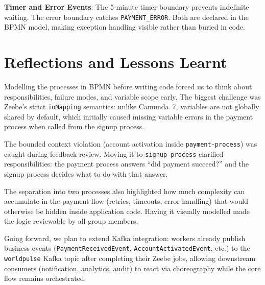 \documentclass[10pt,a4paper]{article}
\begin{document}
\textbf{Timer and Error Events}: The 5-minute timer boundary prevents indefinite waiting. The error boundary catches \texttt{PAYMENT\_ERROR}. Both are declared in the BPMN model, making exception handling visible rather than buried in code.


\section{Reflections and Lessons Learnt}

Modelling the processes in BPMN before writing code forced us to think about responsibilities, failure modes, and variable scope early. The biggest challenge was Zeebe's strict \texttt{ioMapping} semantics: unlike Camunda~7, variables are not globally shared by default, which initially caused missing variable errors in the payment process when called from the signup process.

The bounded context violation (account activation inside \texttt{payment-process}) was caught during feedback review. Moving it to \texttt{signup-process} clarified responsibilities: the payment process answers ``did payment succeed?'' and the signup process decides what to do with that answer.

The separation into two processes also highlighted how much complexity can accumulate in the payment flow (retries, timeouts, error handling) that would otherwise be hidden inside application code. Having it visually modelled made the logic reviewable by all group members.

Going forward, we plan to extend Kafka integration: workers already publish business events (\texttt{PaymentReceivedEvent}, \texttt{AccountActivatedEvent}, etc.) to the \texttt{worldpulse} Kafka topic after completing their Zeebe jobs, allowing downstream consumers (notification, analytics, audit) to react via choreography while the core flow remains orchestrated.
\end{document}
